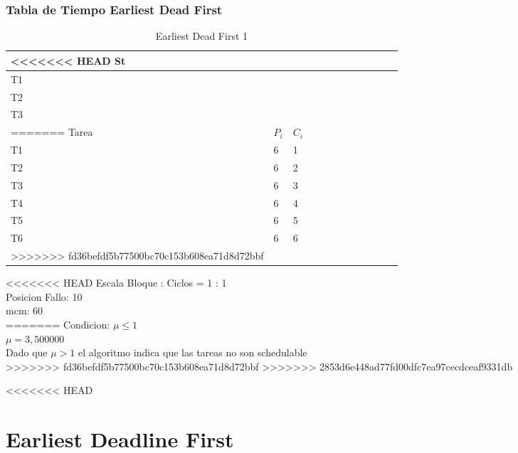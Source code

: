 \documentclass[xcolor=table]{beamer}
\begin{document}
\begin{frame}
\begin{frame} 
\frametitle{Tabla de Tiempo  Earliest Dead First } 
\begin{table} 
\centering 
\begin{tabular}{|l|l|l|l|l|l|l|l|l|l|l|l|} 
\hline 
<<<<<<< HEAD
St & \cellcolor{green} & \cellcolor{green} & \cellcolor{green} & \cellcolor{green} & \cellcolor{green} & \cellcolor{green} & \cellcolor{green} & \cellcolor{green} & \cellcolor{green} & \cellcolor{green} & \cellcolor{red} \\ \hline 
T1 & \cellcolor{blue} & & & & & \cellcolor{blue} & & & \cellcolor{blue} & & \\ \hline 
T2 & & & & \cellcolor{purple} & \cellcolor{purple} & & & & & \cellcolor{purple} & \cellcolor{purple} \\ \hline 
T3 & & \cellcolor{cyan} & \cellcolor{cyan} & & & & \cellcolor{cyan} & \cellcolor{cyan} & & & \\ \hline 
=======
\cellcolor{lightgray}Tarea & \cellcolor{lightgray}$P_i$ & \cellcolor{lightgray}$C_i$ \\ \hline 
T1   & 6  &  1\\ \hline 
T2   & 6  &  2\\ \hline 
T3   & 6  &  3\\ \hline 
T4   & 6  &  4\\ \hline 
T5   & 6  &  5\\ \hline 
T6   & 6  &  6\\ \hline 
>>>>>>> fd36befdf5b77500bc70c153b608ea71d8d72bbf
\end{tabular} 
\caption{ Earliest Dead First 1 } 
\end{table} 
<<<<<<< HEAD
Escala Bloque : Ciclos = 1 : 1 \\ 
Posicion Fallo:  10 \\ 
mcm:  60 \\ 
=======
Condicion: $\mu \leq 1$ \\ 
$\mu =  3,500000 $ \\ 
Dado que $\mu>1$ el algoritmo indica que las tareas no son schedulable \\ 
>>>>>>> fd36befdf5b77500bc70c153b608ea71d8d72bbf
>>>>>>> 2853d6e448ad77fd00dfc7ea97cecdceaf9331db
\end{frame} 


<<<<<<< HEAD
\section{Earliest Deadline First}


\end{frame}
\end{document}
